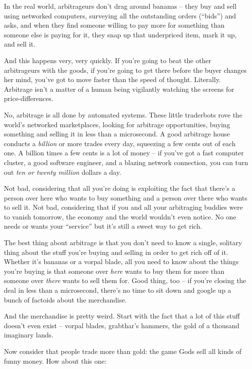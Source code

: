 In the real world, arbitrageurs don't drag around bananas -- they
buy and sell using networked computers, surveying all the
outstanding orders (``bids'') and asks, and when they find someone
willing to pay more for something than someone else is paying for
it, they snap up that underpriced item, mark it up, and sell it.

And this happens very, very quickly. If you're going to beat the
other arbitrageurs with the goods, if you're going to get there
before the buyer changes her mind, you've got to move faster than
the speed of thought. Literally. Arbitrage isn't a matter of a
human being vigilantly watching the screens for price-differences.

No, arbitrage is all done by automated systems. These little
traderbots rove the world's networked marketplaces, looking for
arbitrage opportunities, buying something and selling it in less
than a microsecond. A good arbitrage house conducts a
\emph{billion} or more trades every day, squeezing a few cents out
of each one. A billion times a few cents is a lot of money -- if
you've got a fast computer cluster, a good software engineer, and a
blazing network connection, you can turn out
\emph{ten or twenty million} dollars a day.

Not bad, considering that all you're doing is exploiting the fact
that there's a person over here who wants to buy something and a
person over there who wants to sell it. Not bad, considering that
if you and all your arbitraging buddies were to vanish tomorrow,
the economy and the world wouldn't even notice. No one needs or
wants your ``service'' but it's still a sweet way to get rich.

The best thing about arbitrage is that you don't need to know a
single, solitary thing about the stuff you're buying and selling in
order to get rich off of it. Whether it's bananas or a vorpal
blade, all you need to know about the things you're buying is that
someone over \emph{here} wants to buy them for more than someone
over \emph{there} wants to sell them for. Good thing, too -- if
you're closing the deal in less than a microsecond, there's no time
to sit down and google up a bunch of factoids about the
merchandise.

And the merchandise is pretty weird. Start with the fact that a lot
of this stuff doesn't even exist -- vorpal blades, grabthar's
hammers, the gold of a thousand imaginary lands.

Now consider that people trade more than gold: the game Gods sell
all kinds of funny money. How about this one:

